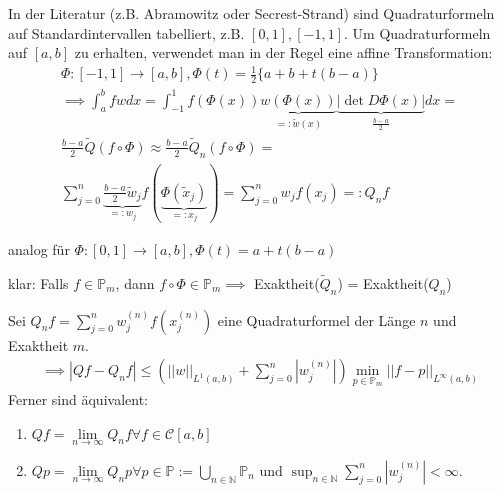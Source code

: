 \begin{remark}
	In der Literatur (z.B. Abramowitz oder Secrest-Strand) sind Quadraturformeln auf Standardintervallen tabelliert, z.B. $[0, 1], [-1, 1]$. Um Quadraturformeln auf $[a, b]$ zu erhalten, verwendet man in der Regel eine affine Transformation:
	\begin{align*}
		\Phi: [-1, 1] \rightarrow [a, b], \Phi(t) = \frac{1}{2} \{a + b + t(b-a)\}\\
		\implies \int_{a}^{b} fw dx = \int_{-1}^{1} f(\Phi(x)) \underbrace{w(\Phi(x))}_{=: \tilde{w}(x)} \underbrace{|\det D\Phi(x)|}_{\frac{b-a}{2}} dx =\\
		\frac{b-a}{2} \tilde{Q}(f \circ \Phi) \approx
		\frac{b-a}{2} \tilde{Q}_n(f\circ \Phi) =\\
		\sum_{j=0}^{n} \underbrace{\frac{b-a}{2} \tilde{w}_j}_{=: w_j} f(\underbrace{\Phi(\tilde{x}_j)}_{=: x_j}) =
		\sum_{j=0}^{n} w_j f(x_j) =:
		Q_n f
	\end{align*}
	
	analog für $\Phi: [0, 1] \rightarrow [a, b], \Phi(t) = a + t(b-a)$
	
	klar: Falls $f \in \mathbb{P}_m$, dann $f \circ \Phi \in \mathbb{P}_m \implies$ Exaktheit($\tilde{Q}_n$) = Exaktheit($Q_n$)
\end{remark}

\begin{theorem}
	Sei $Q_nf = \sum_{j=0}^{n} w_j^{(n)} f(x_j^{(n)})$ eine Quadraturformel der Länge $n$ und Exaktheit $m$.
	\begin{align*}
		\implies |Qf - Q_nf| \leq (||w||_{L^1(a,b)} + \sum_{j=0}^{n}|w_j^{(n)}|) \min_{p \in \mathbb{P}_m} ||f-p||_{L^\infty(a,b)}
	\end{align*}
	Ferner sind äquivalent:
	\begin{enumerate}
		\item $Qf = \lim\limits_{n\rightarrow\infty} Q_n f \forall f \in \mathcal{C}[a,b]$
		\item $Qp = \lim\limits_{n\rightarrow\infty} Q_n p \forall p \in \mathbb{P} := \bigcup_{n\in\mathbb{N}} \mathbb{P}_n$ und $\sup_{n\in\mathbb{N}} \sum_{j=0}^{n} |w_j^{(n)}| < \infty$.
	\end{enumerate}
\end{theorem}

